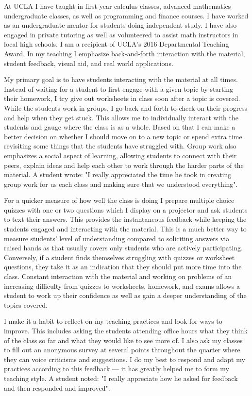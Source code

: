 \documentclass[11pt]{article}
\begin{document}
At UCLA I have taught in first-year calculus classes, advanced mathematics undergraduate classes, as well as programming and finance courses.
I have worked as an undergraduate mentor for students doing independent study.
I have also engaged in private tutoring as well as volunteered to assist math instructors in local high schools.
I am a recipient of UCLA's 2016 Departmental Teaching Award.
In my teaching I emphasize back-and-forth interaction with the material, student feedback, visual aid, and real world applications.

My primary goal is to have students interacting with the material at all times.
Instead of waiting for a student to first engage with a given topic by starting their homework,
I try give out worksheets in class soon after a topic is covered.
While the students work in groups, I go back and forth to check on their progress and help when they get stuck.
This allows me to individually interact with the students and gauge where the class is as a whole.
Based on that I can make a better decision on whether I should move on to a new topic or spend extra time revisiting some things that the students have struggled with.
Group work also emphasizes a social aspect of learning, allowing students to connect with their peers,
explain ideas and help each other to work through the harder parts of the material.
A student wrote: "I really appreciated the time he took in creating group work for us each class and making sure that we understood everything".

For a quicker measure of how well the class is doing I prepare multiple choice quizzes with one or two questions
which I display on a projector and ask students to text their answers.
This provides the instantaneous feedback while keeping the students engaged and interacting with the material.
This is a much better way to measure students' level of understanding compared to soliciting answers via raised hands as that usually covers only students who are actively participating.
Conversely, if a student finds themselves struggling with quizzes or worksheet questions, they take it as an indication that they should put more time into the class.
Constant interaction with the material and working on problems of an increasing difficulty from quizzes to worksheets, homework, and exams allows
a student to work up their confidence as well as gain a deeper understanding of the topics covered.

I make it a habit to reflect on my teaching practices and look for ways to improve.
This includes asking the students attending office hours what they think of the class so far and what they would like to see more of.
I also ask my classes to fill out an anonymous survey at several points throughout the quarter where they can voice criticisms and suggestions.
I do my best to respond and adapt my practices according to this feedback --- it has greatly helped me to form my teaching style.
A student noted: "I really appreciate how he asked for feedback and then responded and improved".
\end{document}
